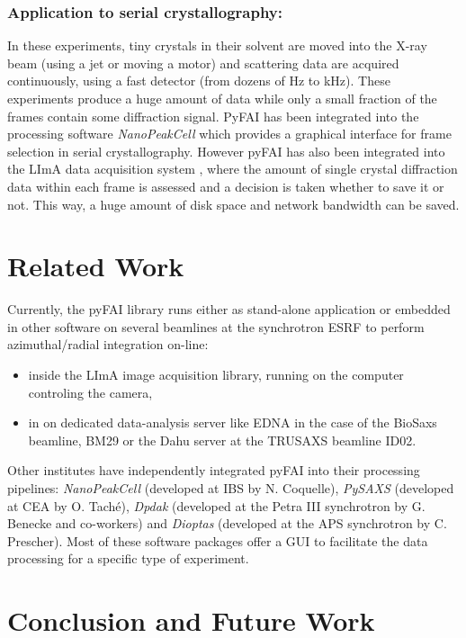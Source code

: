 \documentclass{iucr}
\begin{document}
\subsubsection{Application to serial crystallography:}
In these experiments, tiny crystals in their solvent are moved into
the X-ray beam (using a jet or moving a motor) and scattering data are acquired
continuously, using a fast detector (from dozens of Hz to kHz).
These experiments produce a huge amount of data while only a small fraction of the
frames contain some diffraction signal.
PyFAI has been integrated into the processing software \textit{NanoPeakCell}
which provides a graphical interface for frame selection in serial crystallography.
However pyFAI has also been integrated into the LImA data acquisition system
\cite{lima}, where the amount of single crystal diffraction data within each
frame is assessed and a decision is taken whether to save it or not.
This way, a huge amount of disk space and network bandwidth
can be saved.

\section{Related Work}

Currently, the pyFAI library runs either as stand-alone application or
embedded in other software on several beamlines at the synchrotron ESRF to
perform azimuthal/radial integration on-line:
\begin{itemize}
  \item inside the LImA image acquisition library, running on the
  computer controling the camera,
  \item in on dedicated data-analysis server like EDNA \cite{edna} in the case
  of the BioSaxs beamline, BM29 \cite{bm29} or the Dahu server at the TRUSAXS
  beamline ID02.
\end{itemize}

Other institutes have independently integrated pyFAI into their processing
pipelines: \textit{NanoPeakCell} (developed at IBS by N. Coquelle),
\textit{PySAXS} (developed at CEA by O. Taché), \textit{Dpdak} (developed
at the Petra III synchrotron by G. Benecke and co-workers) \cite{dpdak}
and \textit{Dioptas} (developed at the APS synchrotron by C. Prescher).
Most of these software packages offer a GUI to facilitate the
data processing for a specific type of experiment.

\section{Conclusion and Future Work}
\end{document}
